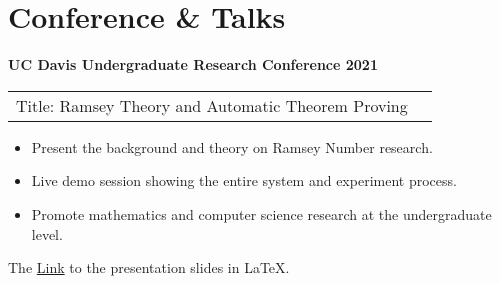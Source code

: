 \section{\sc Conference \& Talks}
{\bf{UC Davis Undergraduate Research Conference 2021}}\\
\begin{tabular}{@{}p{4in}p{2in}}
Title: Ramsey Theory and Automatic Theorem Proving \\
\end{tabular}
\begin{itemize}
\setlength\itemsep{0em}
\item Present the background and theory on Ramsey Number research.
\item Live demo session showing the entire system and experiment process.
\item Promote mathematics and computer science research at the undergraduate level.
\end{itemize}
The \href{https://www.math.ucdavis.edu/application/files/7916/3482/8109/chang.pdf}{Link}  to the presentation slides in \LaTeX.

\endinput